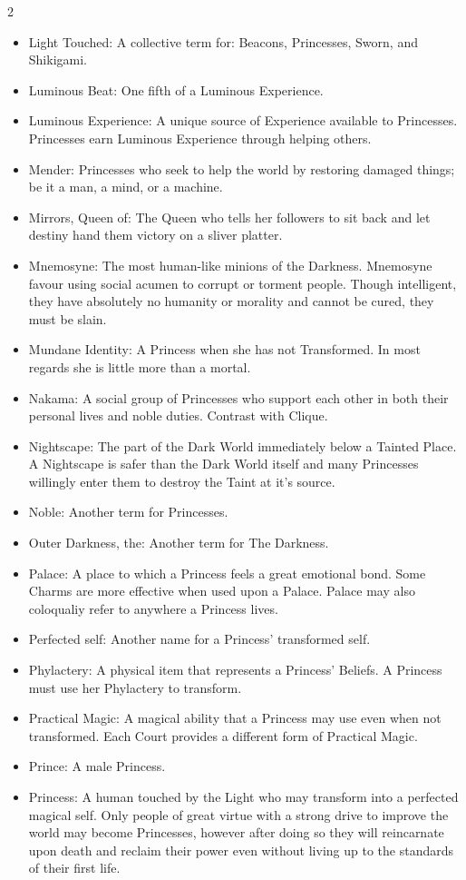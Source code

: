 \begin{multicols}{2}
\begin{itemize}
  \item Light Touched: A collective term for: Beacons, Princesses, Sworn, and Shikigami.
  \item Luminous Beat: One fifth of a Luminous Experience. 
  \item Luminous Experience: A unique source of Experience available to Princesses. Princesses earn Luminous Experience through helping others.
  \item Mender: Princesses who seek to help the world by restoring damaged things; be it a man, a mind, or a machine.
  \item Mirrors, Queen of: The Queen who tells her followers to sit back and let destiny hand them victory on a sliver platter.  
  \item Mnemosyne: The most human-like minions of the Darkness. Mnemosyne favour using social acumen to corrupt or torment people. Though intelligent, they have absolutely no humanity or morality and cannot be cured, they must be slain. 
  \item Mundane Identity: A Princess when she has not Transformed. In most regards she is little more than a mortal. 
  \item Nakama: A social group of Princesses who support each other in both their personal lives and noble duties. Contrast with Clique. 
  \item Nightscape: The part of the Dark World immediately below a Tainted Place. A Nightscape is safer than the Dark World itself and many Princesses willingly enter them to destroy the Taint at it's source. 
  \item Noble: Another term for Princesses. 
  \item Outer Darkness, the: Another term for The Darkness. 
  \item Palace: A place to which a Princess feels a great emotional bond. Some Charms are more effective when used upon a Palace. Palace may also coloqualiy refer to anywhere a Princess lives. 
  \item Perfected self: Another name for a Princess' transformed self. 
  \item Phylactery: A physical item that represents a Princess' Beliefs. A Princess must use her Phylactery to transform. 
  \item Practical Magic: A magical ability that a Princess may use even when not transformed. Each Court provides a different form of Practical Magic. 
  \item Prince: A male Princess. 
  \item Princess: A human touched by the Light who may transform into a perfected magical self. Only people of great virtue with a strong drive to improve the world may become Princesses, however after doing so they will reincarnate upon death and reclaim their power even without living up to the standards of their first life.

\end{itemize}
\end{multicols}

